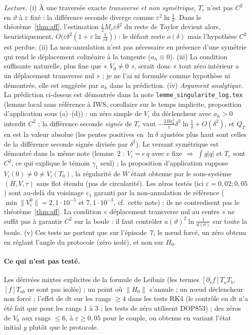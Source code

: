 \documentclass[11pt,a4paper]{article}
\theoremstyle{remark}
\theoremstyle{definition}
\newcommand{\norm}[1]{\lVert #1\rVert}
\newcommand{\eps}{\varepsilon}
\newcommand{\vth}{\vartheta}
\begin{document}
\emph{Lecture.} (i) À une traversée exacte \emph{transverse et non symétrique}, $T_r$ n'est pas $C^2$ en $\vth$ à $\eps$ fixé : la différence seconde diverge comme $\eps^2\ln\frac1\delta$. Dans le théorème~\ref{thm:aff}, l'estimation $\tfrac12M_r\eps\delta^2$ du reste de Taylor devient alors, heuristiquement, $O\bigl(\eps\delta^2(1+\eps\ln\frac1{\eps\delta})\bigr)$ : le défaut reste $o(\delta)$ mais l'hypothèse $C^2$ est perdue. (ii) La non-annulation n'est pas nécessaire en présence d'une symétrie qui rend le déplacement colinéaire à la tangente ($a_h\equiv0$). (iii) La condition suffisante naturelle, plus fine que « $V_0\neq0$ », serait donc « tout zéro intérieur a un déplacement transverse nul » ; je ne l'ai ni formulée comme hypothèse ni démontrée, elle est suggérée par $a_h$ dans la prédiction. (iv) \emph{Argument analytique.} La prédiction ci-dessus est démontrée dans la note \texttt{lemme\_singularite\_log.tex} (lemme local sans référence à IWS, corollaire sur le temps implicite, proposition d'application sous (a)--(d)) : un zéro simple de $V_i$ du déclencheur avec $a_h>0$ interdit $C^2$ ; la différence seconde \emph{signée} de $T_r$ vaut $-\frac{2Ba_h^2}{v}\delta^2\ln\frac1\delta+O(\delta^2)$, et $Q_T$ en est la valeur absolue (les pentes positives en $\ln\delta$ ajustées plus haut sont celles de la différence seconde signée divisée par $\delta^2$). Le versant symétrique est démontré dans la même note (lemme~2 : $V_i=e\,q$ avec $e$ fixe $\Rightarrow$ $\int g\lvert q\rvert$ et $T_r$ sont $C^2$, ce qui explique le témoin $\gamma_1$ seul) ; la proposition d'application suppose $V_i(0)\ne0\ne V_i(T_0)$, la régularité de $W$ étant obtenue par le sous-système $(H,V,\tau)$ sans flot étendu (pas de circularité). Les zéros testés (ici $\eps=0{,}02;0{,}05$) sont au-delà du voisinage $\eps_1$ garanti par la non-annulation de référence ($\min\lVert V^0_i\rVert=2{,}1\cdot10^{-5}$ et $7{,}1\cdot10^{-3}$, cf.\ cette note) : ils ne contredisent pas le théorème~\ref{thm:aff}. La condition « déplacement transverse nul au centre » ne suffit pas à garantir $C^2$ sur la boule : il faut contrôler $a(\vth)^2\ln\frac1{d(\vth)}$ sur toute la boule. (v) Ces tests ne portent que sur l'épisode~7, le n\oe ud forcé, un zéro obtenu en réglant l'angle du protocole (zéro isolé), et non sur $H_0$.

\paragraph{Ce qui n'est pas testé.} Les dérivées mixtes explicites de la formule de Leibniz (les termes $[\partial_sf]T_aT_b$, $[f]T_{ab}$ ne sont pas isolés) ; un point où $\norm{H_0}$ s'annule ; un n\oe ud déclencheur non forcé ; l'effet de $\mathrm{dt}$ sur les rangs $\ge4$ dans les tests RK4 (le contrôle en $\mathrm{dt}$ n'a été fait que pour les rangs $1$ à $3$ ; les tests de zéro utilisent DOP853) ; des zéros de $V_0$ aux rangs $\le6$, à $\eps\ge0{,}05$ pour le couple, ou obtenus en variant l'état initial $y$ plutôt que le protocole.
\end{document}
